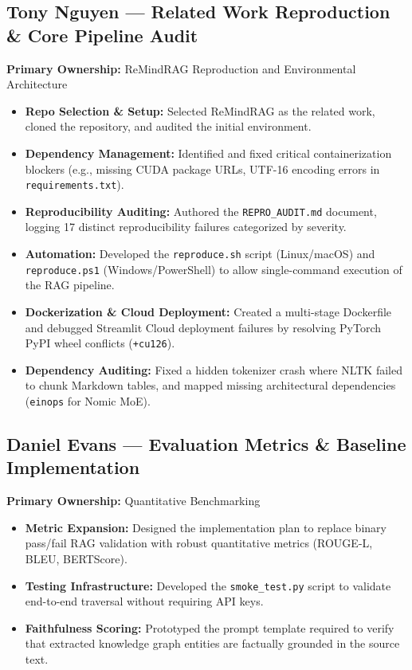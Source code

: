 \documentclass[11pt, letterpaper]{article}
\begin{document}
\subsection*{Tony Nguyen — Related Work Reproduction \& Core Pipeline Audit}
\textbf{Primary Ownership:} ReMindRAG Reproduction and Environmental Architecture
\begin{itemize}[leftmargin=*]
    \setlength{\itemsep}{1pt}
    \item \textbf{Repo Selection \& Setup:} Selected ReMindRAG as the related work, cloned the repository, and audited the initial environment.
    \item \textbf{Dependency Management:} Identified and fixed critical containerization blockers (e.g., missing CUDA package URLs, UTF-16 encoding errors in \texttt{requirements.txt}).
    \item \textbf{Reproducibility Auditing:} Authored the \texttt{REPRO\_AUDIT.md} document, logging 17 distinct reproducibility failures categorized by severity.
    \item \textbf{Automation:} Developed the \texttt{reproduce.sh} script (Linux/macOS) and \texttt{reproduce.ps1} (Windows/PowerShell) to allow single-command execution of the RAG pipeline.
    \item \textbf{Dockerization \& Cloud Deployment:} Created a multi-stage Dockerfile and debugged Streamlit Cloud deployment failures by resolving PyTorch PyPI wheel conflicts (\texttt{+cu126}).
    \item \textbf{Dependency Auditing:} Fixed a hidden tokenizer crash where NLTK failed to chunk Markdown tables, and mapped missing architectural dependencies (\texttt{einops} for Nomic MoE).
\end{itemize}

\subsection*{Daniel Evans — Evaluation Metrics \& Baseline Implementation}
\textbf{Primary Ownership:} Quantitative Benchmarking
\begin{itemize}[leftmargin=*]
    \setlength{\itemsep}{1pt}
    \item \textbf{Metric Expansion:} Designed the implementation plan to replace binary pass/fail RAG validation with robust quantitative metrics (ROUGE-L, BLEU, BERTScore).
    \item \textbf{Testing Infrastructure:} Developed the \texttt{smoke\_test.py} script to validate end-to-end traversal without requiring API keys.
    \item \textbf{Faithfulness Scoring:} Prototyped the prompt template required to verify that extracted knowledge graph entities are factually grounded in the source text.
\end{itemize}
\end{document}
